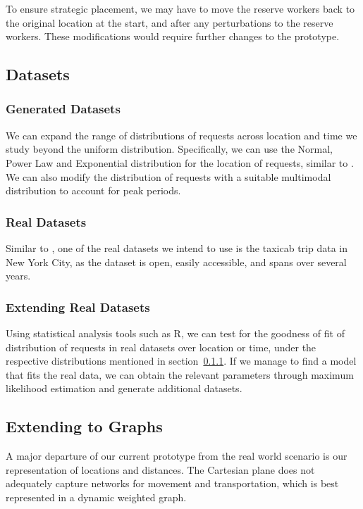 \documentclass[urop]{nurop}
\begin{document}
To ensure strategic placement, we may have to move the reserve workers back to the original location at the start, and after any perturbations to the reserve workers. These modifications would require further changes to the prototype.

\subsection{Datasets}
\subsubsection{Generated Datasets}
\label{dataset}
We can expand the range of distributions of requests across location and time we study beyond the uniform distribution. Specifically, we can use the Normal, Power Law and Exponential distribution for the location of requests, similar to \cite{tong}. We can also modify the distribution of requests with a suitable multimodal distribution to account for peak periods.

\subsubsection{Real Datasets}
Similar to \cite{nature}, one of the real datasets we intend to use is the taxicab trip data in New York City, as the dataset is open, easily accessible, and spans over several years.

\subsubsection{Extending Real Datasets}
Using statistical analysis tools such as R, we can test for the goodness of fit of distribution of requests in real datasets over location or time, under the respective distributions mentioned in section~\ref{dataset}. If we manage to find a model that fits the real data, we can obtain the relevant parameters through maximum likelihood estimation and generate additional datasets.

\subsection{Extending to Graphs}
A major departure of our current prototype from the real world scenario is our representation of locations and distances. The Cartesian plane does not adequately capture networks for movement and transportation, which is best represented in a dynamic weighted graph.
\end{document}
